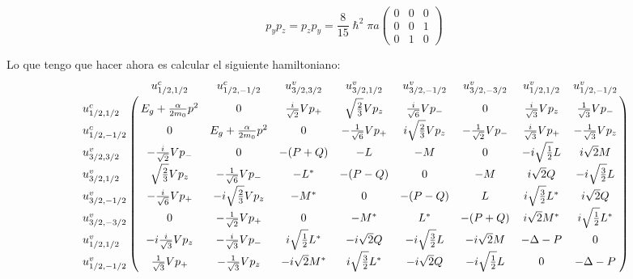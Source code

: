 \documentclass[10pt,a4paper]{article}
\begin{document}
\begin{equation}
p_yp_z=p_zp_y=\frac{8}{15}\hslash^2\pi a \begin{pmatrix}
                                         0 & 0 & 0 \\
                                         0 & 0 & 1 \\
                                         0 & 1 & 0
                                         \end{pmatrix}
\end{equation}


Lo que tengo que hacer ahora es calcular el siguiente hamiltoniano:
\begin{equation}\label{hamiltoniano}
\bordermatrix{~      &     u_{1/2,1/2}^c & u_{1/2,-1/2}^c & u_{3/2,3/2}^v & u_{3/2,1/2}^v & u_{3/2,-1/2}^v & u_{3/2,-3/2}^v & u_{1/2,1/2}^v & u_{1/2,-1/2}^v \cr
      u_{1/2,1/2}^c  & E_g+\frac{\alpha}{2m_0}p^2 & 0 & \frac{i}{\sqrt{2}} Vp_{+} & \sqrt{\frac{2}{3}}Vp_z & \frac{i}{\sqrt{6}}Vp_{-} & 0 & \frac{i}{\sqrt{3}}Vp_z & \frac{1}{\sqrt{3}}Vp_{-} \cr
      u_{1/2,-1/2}^c & 0 & E_g+\frac{\alpha}{2m_0}p^2 & 0 & -\frac{1}{\sqrt{6}}Vp_{+} & i\sqrt{\frac{2}{3}}Vp_z & -\frac{1}{\sqrt{2}}Vp_{-} & \frac{i}{\sqrt{3}}Vp_{+} & -\frac{1}{\sqrt{3}}Vp_{z}  \cr
      u_{3/2,3/2}^v  & -\frac{i}{\sqrt{2}}Vp_{-} & 0 & -(P+Q) & -L & -M & 0 & -i\sqrt{\frac{1}{2}}L & i\sqrt{2}M \cr
      u_{3/2,1/2}^v  & \sqrt{\frac{2}{3}}Vp_z & -\frac{1}{\sqrt{6}}Vp_{-} & -L^* & -(P-Q) & 0 & -M & i\sqrt{2}Q & -i\sqrt{\frac{3}{2}}L \cr
      u_{3/2,-1/2}^v & -\frac{i}{\sqrt{6}}Vp_{+} & -i\sqrt{\frac{2}{3}}Vp_z & -M^* & 0 & -(P-Q) & L & i\sqrt{\frac{3}{2}}L^* & i\sqrt{2}Q \cr
      u_{3/2,-3/2}^v & 0 & -\frac{1}{\sqrt{2}}Vp_{+} & 0 & -M^* & L^* & -(P+Q) & i\sqrt{2}M^* & i\sqrt{\frac{1}{2}}L^* \cr
      u_{1/2,1/2}^v  & -i\frac{i}{\sqrt{3}}Vp_z & -\frac{i}{\sqrt{3}}Vp_{-} & i\sqrt{\frac{1}{2}}L^* & -i\sqrt{2}Q & -i\sqrt{\frac{3}{2}}L & -i\sqrt{2}M & -\Delta-P & 0 \cr
      u_{1/2,-1/2}^v & \frac{1}{\sqrt{3}}Vp_{+} & -\frac{1}{\sqrt{3}}Vp_z & -i\sqrt{2}M^* & i\sqrt{\frac{3}{2}}L^* & -i\sqrt{2}Q & -i\sqrt{\frac{1}{2}}L & 0 & -\Delta-P \cr}
\end{equation}
\end{document}
